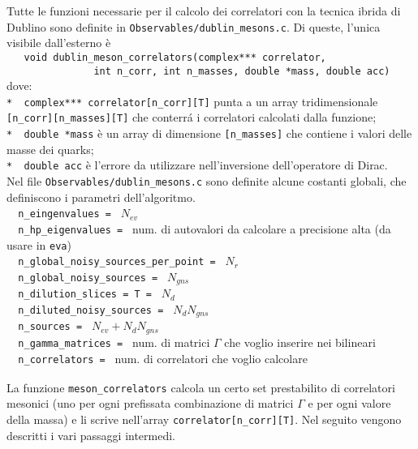 \documentclass[a4paper]{article}
\begin{document}
Tutte le funzioni necessarie per il calcolo dei correlatori con la tecnica ibrida di Dublino sono definite in \verb|Observables/dublin_mesons.c|. Di queste, l'unica visibile dall'esterno \`{e} \\
\verb|   void dublin_meson_correlators(complex*** correlator,|\\
\verb|               int n_corr, int n_masses, double *mass, double acc)|\\
dove:\\
\verb|*  complex*** correlator[n_corr][T]| punta a un array tridimensionale \verb|[n_corr][n_masses][T]| che conterr\'{a} i correlatori calcolati dalla funzione;\\
\verb|*  double *mass| \`{e} un array di dimensione \verb|[n_masses]| che contiene i valori delle masse dei quarks;\\
\verb|*  double acc| \`{e} l'errore da utilizzare nell'inversione dell'operatore di Dirac.
\verb| |\\

Nel file \verb|Observables/dublin_mesons.c| sono definite alcune costanti globali, che definiscono i parametri dell'algoritmo.\\
\verb|  n_eingenvalues = | $ N_{ev}$\\
\verb|  n_hp_eigenvalues = | num. di autovalori da calcolare a precisione alta (da usare in \verb|eva|)\\
\verb|  n_global_noisy_sources_per_point = | $ N_r $\\
\verb|  n_global_noisy_sources = | $ N_{gns} $\\
\verb|  n_dilution_slices = T = | $ N_d $\\
\verb|  n_diluted_noisy_sources = | $ N_d N_{gns} $\\
\verb|  n_sources = | $N_{ev} + N_d N_{gns}$ \\
\verb|  n_gamma_matrices = | num. di matrici $\Gamma$ che voglio inserire nei bilineari\\
\verb|  n_correlators = | num. di correlatori che voglio calcolare\\
\verb| |\\

La funzione \verb|meson_correlators| calcola un certo set prestabilito di correlatori mesonici (uno per ogni prefissata combinazione di matrici $\Gamma$ e per ogni valore della massa) e li scrive nell'array \verb|correlator[n_corr][T]|. Nel seguito vengono descritti i vari passaggi intermedi.
\end{document}
